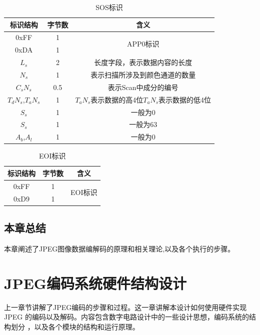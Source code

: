 \documentclass{article}
\numberwithin {equation}{section}
\begin{document}
\begin{spacing}{1.25}
    \begin{table}[H]
      \centering
      \caption{SOS标识}
      \begin{tabular}{ccc}
        \toprule
        标识结构 & 字节数 & 含义\\
        \midrule
        0xFF & 1 & \multirow{2}{*}{APP0标识}\\
        0xDA & 1 &\\
        $L_{s}$ & 2 & 长度字段，表示数据内容的长度\\
        $N_{s}$ & 1 & 表示扫描所涉及到颜色通道的数量\\
        $C_{s}N_{s}$ & 0.5 & 表示Scan中成分的编号\\
        $T_{d}N_{s}$,$T_{a}N_{s}$ & 1 & $T_{a}N_{s}$表示数据的高4位$T_{a}N_{s}$表示数据的低4位\\
        $S_{s}$ & 1 & 一般为0\\
        $S_{s}$ & 1 & 一般为63\\
        $A_{b}$,$A_{l}$ & 1 & 一般为0\\
        \bottomrule
      \end{tabular}
    \end{table}

    \begin{table}[H]
      \centering
      \caption{EOI标识}
      \begin{tabular}{ccc}
        \toprule
        标识结构 & 字节数 & 含义\\
        \midrule
        0xFF & 1 & \multirow{2}{*}{EOI标识}\\
        0xD9 & 1 &\\
        \bottomrule
      \end{tabular}
    \end{table}
  \subsection{本章总结}
    \vspace{1em}
    本章阐述了JPEG图像数据编解码的原理和相关理论,以及各个执行的步骤。

\newpage
\section{JPEG编码系统硬件结构设计}
  \vspace{1em}
  上一章节讲解了JPEG编码的步骤和过程。这一章讲解本设计如何使用硬件实现JPEG
  的编码以及解码。内容包含数字电路设计中的一些设计思想，编码系统的结构划分
  ，以及各个模块的结构和运行原理。

\end{spacing}
\end{document}
